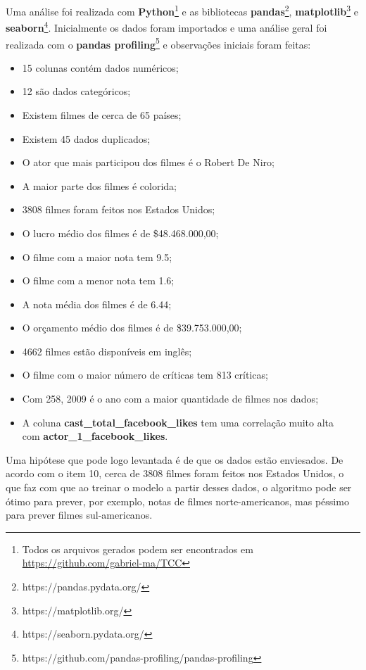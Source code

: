 Uma análise foi realizada com \textbf{Python}\footnote{Todos os arquivos gerados podem ser encontrados em \url{https://github.com/gabriel-ma/TCC}} e as bibliotecas \textbf{pandas}\footnote{https://pandas.pydata.org/}, \textbf{matplotlib}\footnote{https://matplotlib.org/} e \textbf{seaborn}\footnote{https://seaborn.pydata.org/}. Inicialmente os dados foram importados e uma análise geral foi realizada com o \textbf{pandas profiling}\footnote{https://github.com/pandas-profiling/pandas-profiling} e observações iniciais foram feitas:
\begin{itemize}
    \item 15 colunas contém dados numéricos;
    \item 12 são dados categóricos;
    \item Existem filmes de cerca de 65 países;
    \item Existem 45 dados duplicados;
    \item O ator que mais participou dos filmes é o Robert De Niro;
    \item A maior parte dos filmes é colorida;
    \item 3808  filmes foram feitos nos Estados Unidos;
    \item O lucro médio dos filmes é de \$48.468.000,00;
    \item O filme com a maior nota tem 9.5;
    \item O filme com a menor nota tem 1.6;
    \item A nota média dos filmes é de 6.44;
    \item O orçamento médio dos filmes é de \$39.753.000,00;
    \item 4662 filmes estão disponíveis em inglês;
    \item O filme com o maior número de críticas tem 813 críticas;
    \item Com 258, 2009 é o ano com a maior quantidade de filmes nos dados;
    \item A coluna \textbf{cast\_total\_facebook\_likes} tem uma correlação muito alta\\ com \textbf{actor\_1\_facebook\_likes}.
\end{itemize}

Uma hipótese que pode logo levantada é de que os dados estão enviesados. De acordo com o item 10, cerca de 3808 filmes foram feitos nos Estados Unidos, o que faz com que ao treinar o modelo a partir desses dados, o algoritmo pode ser ótimo para prever, por exemplo, notas de filmes norte-americanos, mas péssimo para prever filmes sul-americanos.


